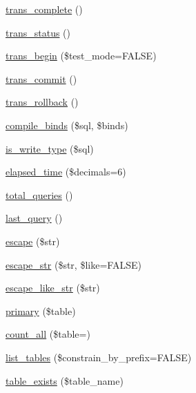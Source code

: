 \begin{DoxyCompactItemize}
\item 
\mbox{\hyperlink{class_c_i___d_b__driver_aa0edd209de428801ce5faa1fe740852e}{trans\+\_\+complete}} ()
\item 
\mbox{\hyperlink{class_c_i___d_b__driver_a7ce49452153f13afde8f9c5212028be6}{trans\+\_\+status}} ()
\item 
\mbox{\hyperlink{class_c_i___d_b__driver_a90e153cf190d273336d77cce930587e1}{trans\+\_\+begin}} (\$test\+\_\+mode=F\+A\+L\+SE)
\item 
\mbox{\hyperlink{class_c_i___d_b__driver_af4fbdcdace4aa94a139b64877601fe9b}{trans\+\_\+commit}} ()
\item 
\mbox{\hyperlink{class_c_i___d_b__driver_a53f76d4dfcd6ac04fb653982442aeef8}{trans\+\_\+rollback}} ()
\item 
\mbox{\hyperlink{class_c_i___d_b__driver_a0ba381d2e9078472bd0167e75cc8033c}{compile\+\_\+binds}} (\$sql, \$binds)
\item 
\mbox{\hyperlink{class_c_i___d_b__driver_af435df5703c238769d6d16fde6d51182}{is\+\_\+write\+\_\+type}} (\$sql)
\item 
\mbox{\hyperlink{class_c_i___d_b__driver_a7bcec8d3f7d72453deb78e296815711a}{elapsed\+\_\+time}} (\$decimals=6)
\item 
\mbox{\hyperlink{class_c_i___d_b__driver_a8fc0b6551e1ca0c68c6e3a66b27310fc}{total\+\_\+queries}} ()
\item 
\mbox{\hyperlink{class_c_i___d_b__driver_a8117354f1fa0b2873f0ad2792dc21389}{last\+\_\+query}} ()
\item 
\mbox{\hyperlink{class_c_i___d_b__driver_ac8f37ca5703d4558c732e692194f8cd6}{escape}} (\$str)
\item 
\mbox{\hyperlink{class_c_i___d_b__driver_aaba16891c8c93600a87075800cc5b72b}{escape\+\_\+str}} (\$str, \$like=F\+A\+L\+SE)
\item 
\mbox{\hyperlink{class_c_i___d_b__driver_a1a15f371afab8d5cfb35e38fc53c620f}{escape\+\_\+like\+\_\+str}} (\$str)
\item 
\mbox{\hyperlink{class_c_i___d_b__driver_a68e5f4a4a6fdb79a9a403b045c59b618}{primary}} (\$table)
\item 
\mbox{\hyperlink{class_c_i___d_b__driver_a7f59c2dc2e3226fe49f35f8c49e8fc94}{count\+\_\+all}} (\$table=\textquotesingle{}\textquotesingle{})
\item 
\mbox{\hyperlink{class_c_i___d_b__driver_accef90659bed312aba1c3df80620b402}{list\+\_\+tables}} (\$constrain\+\_\+by\+\_\+prefix=F\+A\+L\+SE)
\item 
\mbox{\hyperlink{class_c_i___d_b__driver_af148cb2cd5d490d2a480c0c741ceed03}{table\+\_\+exists}} (\$table\+\_\+name)

\end{DoxyCompactItemize}
